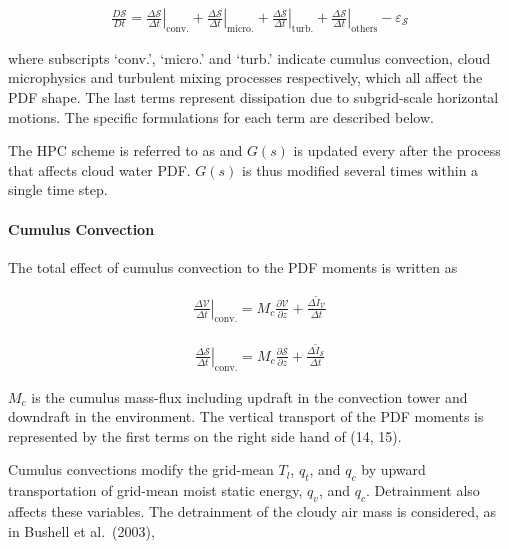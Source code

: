 \begin{eqnarray}
\frac{D \mathcal{S}}{D t}=\left.\frac{\Delta \mathcal{S}}{\Delta t}\right|_{\mathrm{conv.}}+\left.\frac{\Delta \mathcal{S}}{\Delta t}\right|_{\text {micro.}}+\left.\frac{\Delta \mathcal{S}}{\Delta t}
\right|_{\mathrm{turb.}}+\left.\frac{\Delta \mathcal{S}}{\Delta t}\right|_{\text {others}}-\varepsilon_{\mathcal{S}}
\end{eqnarray}

where subscripts `conv.', `micro.' and `turb.' indicate cumulus convection, cloud microphysics and turbulent mixing processes respectively, which all affect the PDF shape. The last terms represent
dissipation due to subgrid-scale horizontal motions. The specific formulations for each term are described below.

The HPC scheme is referred to as and \(G(s)\) is updated every after the process that affects cloud water PDF. \(G(s)\) is thus modified several times within a single time step.

\hypertarget{cumulus-convection}{%
\paragraph{Cumulus Convection}\label{cumulus-convection}}

The total effect of cumulus convection to the PDF moments is written as

\begin{eqnarray}
\left.\frac{\Delta \mathcal{V}}{\Delta t}\right|_{\mathrm{conv} .}=M_{c} \frac{\partial \mathcal{V}}{\partial z}+\frac{\Delta \tilde{I}_{\mathcal{V}}}{\Delta t}
\label{W09-14}
\end{eqnarray}

\begin{eqnarray}
\left.\frac{\Delta \mathcal{S}}{\Delta t}\right|_{\mathrm{conv} .}=M_{c} \frac{\partial \mathcal{S}}{\partial z}+\frac{\Delta \tilde{I}_{\mathcal{S}}}{\Delta t}
\label{W09-15}
\end{eqnarray}

\(M_c\) is the cumulus mass-flux including updraft in the convection tower and downdraft in the environment. The vertical transport of the PDF moments is represented by the first terms on the right
side hand of (14, 15).

Cumulus convections modify the grid-mean \(T_l\), \(q_t\), and \(q_c\) by upward transportation of grid-mean moist static energy, \(q_v\), and \(q_c\). Detrainment also affects these variables. The
detrainment of the cloudy air mass is considered, as in Bushell et al.~(2003),


